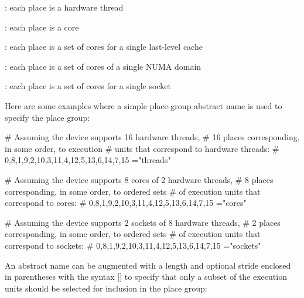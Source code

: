 \begin{compactitem}
\item {}: each place is a hardware thread
\item {}: each place is a core
\item {}: each place is a set of cores for a single last-level cache
\item {}: each place is a set of cores of a single NUMA domain
\item {}: each place is a set of cores for a single socket
\end{compactitem}

Here are some examples where a simple place-group abstract name is used to
specify the place group:

\begin{boxeducode}
# Assuming the device supports 16 hardware threads,
# 16 places corresponding, in some order, to execution
# units that correspond to hardware threads:
# 0,8,1,9,2,10,3,11,4,12,5,13,6,14,7,15
="threads"

# Assuming the device supports 8 cores of 2 hardware threads,
# 8 places corresponding, in some order, to ordered sets
# of execution units that correspond to cores:
# {0,8},{1,9},{2,10},{3,11},{4,12},{5,13},{6,14},{7,15}
="cores"

# Assuming the device supports 2 sockets of 8 hardware threads,
# 2 places corresponding, in some order, to ordered sets
# of execution units that correspond to sockets:
# {0,8,1,9,2,10,3,11},{4,12,5,13,6,14,7,15}
="sockets"
\end{boxeducode}

An abstract name can be augmented with a length and optional stride enclosed in
parentheses with the syntax \code{(}[\code{:}]\code{)}
to specify that only a subset of the execution units should be selected for
inclusion in the place group:

